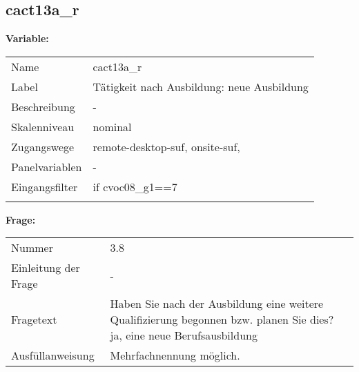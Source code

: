 	
	
	\subsection{cact13a\_r}
	\label{subSection:cact13a_r}

	\noindent\textbf{Variable:}\\
		\begin{tabular}{lL{11.3cm}}
			\label{tableVariable:cact13a_r}
			Name & cact13a\_r \\
			Label & Tätigkeit nach Ausbildung: neue Ausbildung \\
			Beschreibung & - \\
			Skalenniveau & nominal \\
			Zugangswege &
				remote-desktop-suf,
				onsite-suf,
 \\
			Panelvariablen & -
			 \\
			Eingangsfilter & if cvoc08\_g1==7 \\
 \\
		\end{tabular}

		\vspace*{1 cm}
		\noindent\textbf{Frage:}\\
		\begin{tabular}{lL{11.3cm}}
			\label{tableQuestion:cact13a_r}
			Nummer & 3.8 \\
			Einleitung der Frage & - \\
			Fragetext & Haben Sie nach der Ausbildung eine weitere Qualifizierung begonnen bzw. planen Sie dies?
ja, eine neue Berufsausbildung \\
			Ausfüllanweisung & Mehrfachnennung möglich. \\
		\end{tabular}





